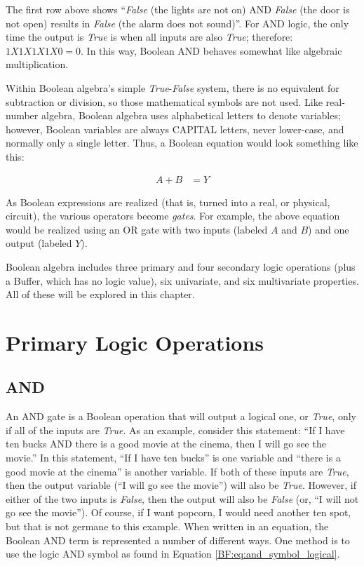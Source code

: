 The first row above shows ``\emph{False} (the lights are not on) AND \emph{False} (the door is not open) results in \emph{False} (the alarm does not sound)''. For \textsf{AND}  logic, the only time the output is \emph{True} is when all inputs are also \emph{True}; therefore: $ 1 X 1 X 1 X 1 X 0 = 0 $. In this way, Boolean \textsf{AND}  behaves somewhat like algebraic multiplication.

Within Boolean algebra's simple \emph{True}-\emph{False} system, there is no equivalent for subtraction or division, so those mathematical symbols are not used. Like real-number algebra, Boolean algebra uses alphabetical letters to denote variables; however, Boolean variables are always CAPITAL letters, never lower-case, and normally only a single letter. Thus, a Boolean equation would look something like this:

\begin{align}
  \label{04eq04}
  A + B &= Y 
\end{align}

As Boolean expressions are realized (that is, turned into a real, or physical, circuit), the various operators become \emph{gates}. For example, the above equation would be realized using an \textsf{OR}  gate with two inputs (labeled $ A $ and $ B $) and one output (labeled $ Y $). 

Boolean algebra includes three primary and four secondary logic operations (plus a Buffer, which has no logic value), six univariate, and six multivariate properties. All of these will be explored in this chapter.

\section{Primary Logic Operations}\label{0401}
\subsection{AND}

An \textsf{AND}  gate is a Boolean operation that will output a logical one, or \emph{True}, only if all of the inputs are \emph{True}. As an example, consider this statement: ``If I have ten bucks AND there is a good movie at the cinema, then I will go see the movie.'' In this statement, ``If I have ten bucks'' is one variable and ``there is a good movie at the cinema'' is another variable. If both of these inputs are \emph{True}, then the output variable (``I will go see the movie'') will also be \emph{True}. However, if either of the two inputs is \emph{False}, then the output will also be \emph{False} (or, ``I will not go see the movie''). Of course, if I want popcorn, I would need another ten spot, but that is not germane to this example. When written in an equation, the Boolean \textsf{AND}  term is represented a number of different ways. One method is to use the logic \textsf{AND} symbol as found in Equation \ref{BF:eq:and_symbol_logical}.


